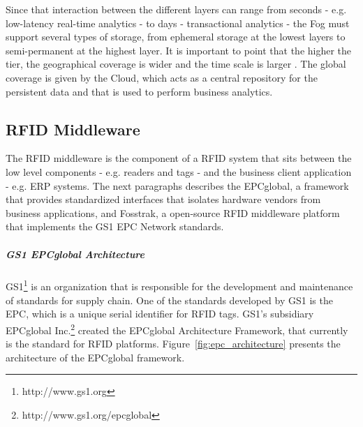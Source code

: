 Since that interaction between the different layers can range from seconds - e.g. low-latency real-time
analytics - to days - transactional analytics - the Fog must support several types of storage, from
ephemeral storage at the lowest layers to semi-permanent at the highest layer. It is important to point
that the higher the tier, the geographical coverage is wider and the time scale is larger \cite{bonomi2014fog}.
The global coverage is given by the Cloud, which acts as a central repository for the persistent data
and that is used to perform business analytics.

\subsection{RFID Middleware}
\label{sub:rfid_middleware}
The \gls{RFID} middleware is the component of a \gls{RFID} system that sits between the low level
components - e.g. readers and tags - and the business client application - e.g. \gls{ERP} systems.
The next paragraphs describes the EPCglobal, a framework that provides standardized interfaces that
isolates hardware vendors from business applications, and Fosstrak, a open-source \gls{RFID}
middleware platform that implements the GS1 \gls{EPC} Network standards.

\subparagraph{GS1 EPCglobal Architecture}
\label{subp:epc_network}
GS1\footnote{http://www.gs1.org} is an organization that is responsible for the development and maintenance of standards for
supply chain. One of the standards developed by GS1 is the \gls{EPC}, which is a unique serial identifier
for \gls{RFID} tags. GS1's subsidiary EPCglobal Inc.\footnote{http://www.gs1.org/epcglobal} created
the EPCglobal Architecture Framework, that currently is the standard for \gls{RFID} platforms.
Figure~\ref{fig:epc_architecture} presents the architecture of the EPCglobal framework.\\

